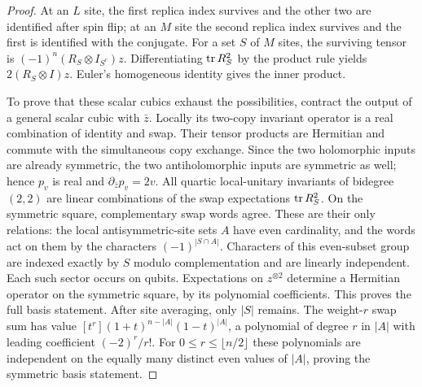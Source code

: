 \begin{proof}
At an $L$ site, the first replica index survives and the other
two are identified after spin flip; at an $M$ site the second
replica index survives and the first is identified with the
conjugate. For a set $S$ of $M$ sites, the surviving tensor is
$(-1)^n(R_S\otimes I_{S^c})z$.
Differentiating $\operatorname{tr} R_S^2$ by the product rule yields
$2(R_S\otimes I)z$. Euler's homogeneous identity gives the
inner product.

To prove that these scalar cubics exhaust the possibilities, contract the output of a general scalar cubic with
$\bar z$. Locally its two-copy invariant operator is a real combination
of identity and swap. Their tensor products are Hermitian and commute
with the simultaneous copy exchange. Since the two holomorphic inputs
are already symmetric, the two antiholomorphic inputs are symmetric
as well; hence $p_v$ is real and $\partial_{\bar z}p_v=2v$.
All quartic local-unitary invariants of bidegree $(2,2)$ are linear combinations of the
swap expectations $\operatorname{tr} R_S^2$. On the symmetric square, complementary
swap words agree. These are their only relations: the local
antisymmetric-site sets $A$ have even cardinality, and the words act
on them by the characters $(-1)^{|S\cap A|}$. Characters of this
even-subset group are indexed exactly by $S$ modulo complementation
and are linearly independent. Each such sector occurs on qubits.
Expectations on $z^{\otimes2}$ determine a Hermitian operator on
the symmetric square, by its polynomial coefficients.
This proves the full basis statement. After site averaging, only
$|S|$ remains. The weight-$r$ swap sum has value
$[t^r](1+t)^{n-|A|}(1-t)^{|A|}$, a polynomial of degree $r$ in $|A|$
with leading coefficient $(-2)^r/r!$. For
$0\le r\le\lfloor n/2\rfloor$ these polynomials are independent on
the equally many distinct even values of $|A|$, proving the symmetric
basis statement.


\end{proof}
